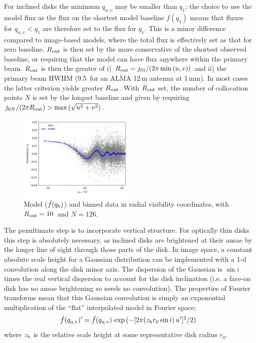 \documentclass[fleqn,usenatbib]{mnras}
\begin{document}
For inclined disks the minimum $q_{u,v}$ may be smaller than $q_1$; the choice to use the model flux as the flux on the shortest model baseline $f(q_1)$ means that fluxes for $q_{u,v}<q_1$ are therefore set to the flux for $q_1$. This is a minor difference compared to image-based models, where the total flux is effectively set as that for zero baseline. $R_{\rm out}$ is then set by the more conservative of the shortest observed baseline, or requiring that the model can have flux anywhere within the primary beam. $R_{\rm out}$ is then the greater of i) $R_{\rm out} = j_{01}/(2 \pi \min{(u,v)})$ and ii) the primary beam HWHM (9.5\arcsec~for an ALMA 12\,m antenna at 1\,mm). In most cases the latter criterion yields greater $R_{\rm out}$. With $R_{\rm out}$ set, the number of collocation points $N$ is set by the longest baseline and given by requiring $j_{0N}/(2 \pi R_{\rm out}) > \max{(\sqrt{u^2+v^2})}$.

\begin{figure}
    \centering
    \hspace{-0.5cm}\includegraphics[width=0.5\textwidth]{model.png}
    \caption{Model ($\Tilde{f}(q_k)$) and binned data in radial visibility coordinates, with $R_{\rm out} = 10$\arcsec~and $N=126$.}
    \label{fig:model}
\end{figure}

The penultimate step is to incorporate vertical structure. For optically thin disks this step is absolutely necessary, as inclined disks are brightened at their ansae by the longer line of sight through those parts of the disk. In image space, a constant absolute scale height for a Gaussian distribution can be implemented with a 1-d convolution along the disk minor axis. The dispersion of the Gaussian is $\sin i$ times the real vertical dispersion to account for the disk inclination (i.e. a face-on disk has no ansae brightening so needs no convolution). The properties of Fourier transforms mean that this Gaussian convolution is simply an exponential multiplication of the ``flat'' interpolated model in Fourier space;
\begin{equation}\label{eq:vert}
    \Tilde{f}(q_{\rm u,v})' = \Tilde{f}(q_{\rm u,v}) \, \exp{(-[2 \pi (z_{\rm h} r_0 \sin i) \, u']^2/2)}
\end{equation}
where $z_{\rm h}$ is the relative scale height at some representative disk radius $r_0$.
\end{document}
